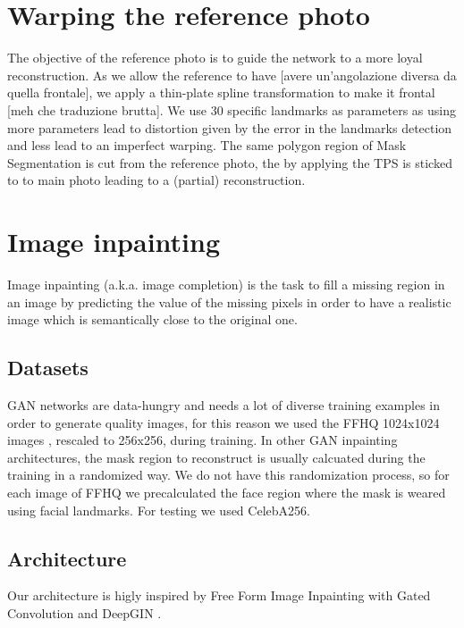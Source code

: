 \documentclass[10pt,twocolumn,letterpaper]{article}
\begin{document}
\section{Warping the reference photo}
The objective of the reference photo is to guide the network to a more loyal
reconstruction. As we allow the reference to have [avere un'angolazione diversa
da quella frontale], we apply a thin-plate spline transformation to make it frontal
[meh che traduzione brutta]. We use 30 specific landmarks as parameters as using
more parameters lead to distortion given by the error in the landmarks detection
and less lead to an imperfect warping. The same polygon region of Mask
Segmentation is cut from the reference photo, the by applying the TPS is sticked
to to main photo leading to a (partial) reconstruction.

\section{Image inpainting}

Image inpainting (a.k.a. image completion) is the task to fill a missing region
in an image by predicting the value of the missing pixels in order to have a
realistic image which is semantically close to the original one.
\subsection{Datasets}
GAN networks are data-hungry and needs a lot of diverse training examples in
order to generate quality images, for this reason we used the FFHQ 1024x1024
images \cite{karras2019style}, rescaled to 256x256, during training.  In other GAN inpainting
architectures, the mask region to reconstruct is usually calcuated during the
training in a randomized way.  We do not have this randomization process, so for
each image of FFHQ we precalculated the face region where the mask is weared
using facial landmarks.  For testing we used CelebA256.

\subsection{Architecture}
Our architecture is higly inspired by Free Form Image Inpainting with Gated
Convolution \cite{yu2019free} and DeepGIN \cite{li2020deepgin}.

{\small


}
\end{document}
